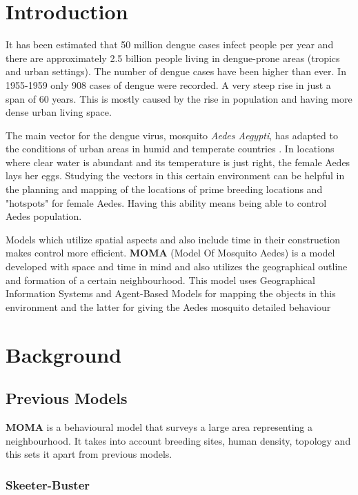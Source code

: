\section{Introduction}

It has been estimated that 50 million dengue cases infect people per year and there are approximately 2.5 billion people living in dengue-prone areas (tropics and urban settings). The number of dengue cases have been higher than ever. In 1955-1959 only 908 cases of dengue were recorded. A very steep rise in just a span of 60 years\cite{who:dengue}. This is mostly caused by the rise in population and having more dense urban living space\cite{urban}.

The main vector for the dengue virus, mosquito \textit{Aedes Aegypti}, has adapted to the conditions of urban areas in humid and temperate countries \cite{descloux,carlos}. In locations where clear water is abundant and its temperature is just right, the female Aedes lays her eggs. Studying the vectors in this certain environment can be helpful in the planning and mapping of the locations of prime breeding locations and "hotspots" for female Aedes\cite{who:dengue}. Having this ability means being able to control Aedes population.

Models which utilize spatial aspects and also include time in their construction makes control more efficient. \textbf{MOMA} (Model Of Mosquito Aedes) is a model developed with space and time in mind and also utilizes the geographical outline and formation of a certain neighbourhood. This model uses Geographical Information Systems and Agent-Based Models for mapping the objects in this environment and the latter for giving the Aedes mosquito detailed behaviour

\section{Background}



\subsection{Previous Models}

\textbf{MOMA} is a behavioural model that surveys a large area representing a neighbourhood. It takes into account breeding sites\cite{skeeter,carlos}, human density, topology\cite{urban} and this sets it apart from previous models.

\subsubsection{Skeeter-Buster} 

